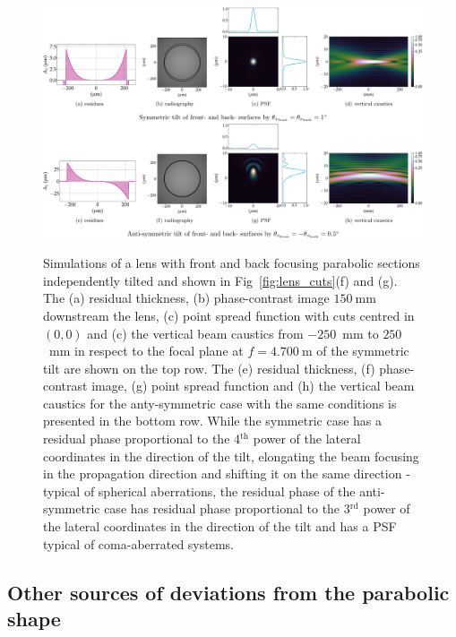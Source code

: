 \begin{refsection}
\begin{figure}[t]
        \centering
        {\includegraphics[width=1.\linewidth]{figures/ch04/tilt_fs_CRL.pdf}}
        \caption[Effects of the tilted parabolic section]{Simulations of a lens with front and back focusing parabolic sections independently tilted and shown in Fig~\ref{fig:lens_cuts}(f) and (g). The (a) residual thickness, (b) phase-contrast image $150~$mm downstream the lens, (c) point spread function with cuts centred in $(0,0)$ and (c) the vertical beam caustics from $-250$~mm to $250$~mm in respect to the focal plane at $f=4.700~$m of the symmetric tilt are shown on the top row. The (e) residual thickness, (f) phase-contrast image, (g) point spread function and (h) the vertical beam caustics for the anty-symmetric case with the same conditions is presented in the bottom row. While the symmetric case has a residual phase proportional to the 4$^{\text{th}}$ power of the lateral coordinates in the direction of the tilt, elongating the beam focusing in the propagation direction and shifting it on the same direction - typical of spherical aberrations, the residual phase of the anti-symmetric case has residual phase proportional to the 3$^{\text{rd}}$ power of the lateral coordinates in the direction of the tilt and has a PSF typical of coma-aberrated systems.  } \label{fig:tilt_fs_CRL}
\end{figure}

\subsection{Other sources of deviations from the parabolic shape}


\end{refsection}
